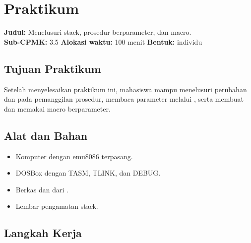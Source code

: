 \section{Praktikum}
\label{sec:praktikum-bab14}

\begin{praktikumbox}
\vspace{1.1em}
\textbf{Judul:} Menelusuri stack, prosedur berparameter, dan macro.\\[0.3em]
\textbf{Sub-CPMK:} 3.5 \quad\textbullet\quad
\textbf{Alokasi waktu:} 100 menit \quad\textbullet\quad
\textbf{Bentuk:} individu
\end{praktikumbox}

\subsection{Tujuan Praktikum}

Setelah menyelesaikan praktikum ini, mahasiswa mampu menelusuri
perubahan  dan  pada pemanggilan prosedur, membaca
parameter melalui , serta membuat dan memakai macro
berparameter.

\subsection{Alat dan Bahan}

\begin{itemize}
    \item Komputer dengan emu8086 terpasang.
    \item DOSBox dengan TASM, TLINK, dan DEBUG.
    \item Berkas  dan  dari
          .
    \item Lembar pengamatan stack.
\end{itemize}

\subsection{Langkah Kerja}

